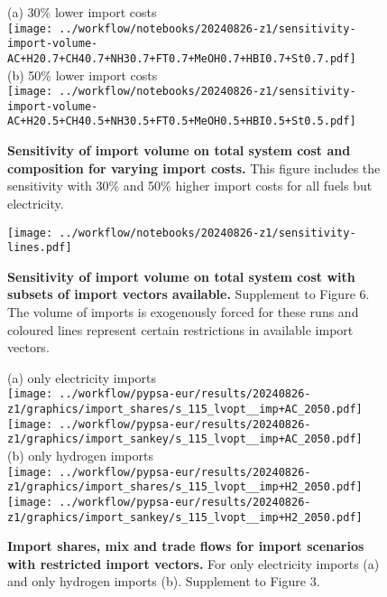 \begin{figure*}
    \small
    (a) 30\% lower import costs \\
    \texttt{[image: ../workflow/notebooks/20240826-z1/sensitivity-import-volume-AC+H20.7+CH40.7+NH30.7+FT0.7+MeOH0.7+HBI0.7+St0.7.pdf]} \\
    (b) 50\% lower import costs \\
    \texttt{[image: ../workflow/notebooks/20240826-z1/sensitivity-import-volume-AC+H20.5+CH40.5+NH30.5+FT0.5+MeOH0.5+HBI0.5+St0.5.pdf]} \\
    \caption{\textbf{Sensitivity of import volume on total system cost and composition for varying import costs.} This figure includes the sensitivity with
    30\% and 50\% higher import costs for all fuels but electricity.}
    \label{fig:si:volume-lower-2}
\end{figure*}


\begin{figure*}
    \texttt{[image: ../workflow/notebooks/20240826-z1/sensitivity-lines.pdf]}
    \caption{\textbf{Sensitivity of import volume on total system cost with
    subsets of import vectors available.} Supplement to Figure 6. The volume of imports is exogenously
    forced for these runs and coloured lines represent certain restrictions in available import vectors.}
    \label{fig:si:volume-subsets}
\end{figure*}


\begin{figure*}
    \centering
    (a) only electricity imports \\
    \texttt{[image: ../workflow/pypsa-eur/results/20240826-z1/graphics/import\_shares/s\_115\_lvopt\_\_imp+AC\_2050.pdf]}
    \texttt{[image: ../workflow/pypsa-eur/results/20240826-z1/graphics/import\_sankey/s\_115\_lvopt\_\_imp+AC\_2050.pdf]} \\

    (b) only hydrogen imports \\
    \texttt{[image: ../workflow/pypsa-eur/results/20240826-z1/graphics/import\_shares/s\_115\_lvopt\_\_imp+H2\_2050.pdf]}
    \texttt{[image: ../workflow/pypsa-eur/results/20240826-z1/graphics/import\_sankey/s\_115\_lvopt\_\_imp+H2\_2050.pdf]} \\
    \caption{\textbf{Import shares, mix and trade flows for import scenarios with restricted
    import vectors.} For only electricity imports (a) and only hydrogen imports
    (b). Supplement to Figure 3.}
    \label{fig:si:import-shares-a}
\end{figure*}

